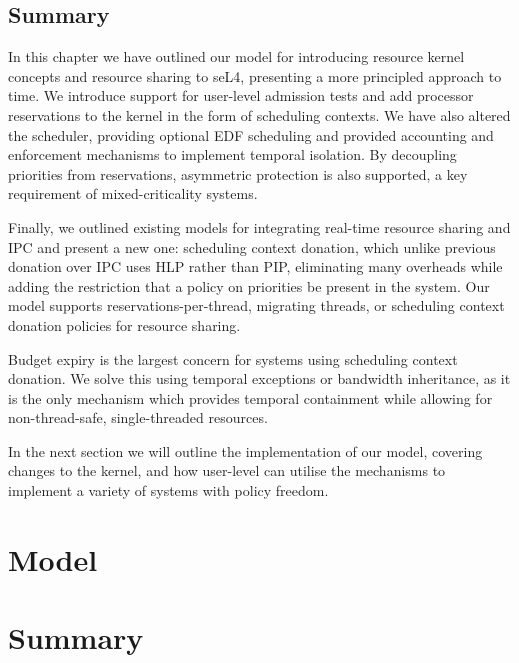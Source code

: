 \subsection{Summary}

In this chapter we have outlined our model for introducing resource kernel concepts and resource sharing to seL4, presenting a more principled approach to time.
We introduce support for user-level admission tests and add processor reservations to the kernel in the form of scheduling contexts.
We have also altered the scheduler, providing optional \gls{EDF} scheduling and provided accounting and enforcement mechanisms to implement temporal isolation.
By decoupling priorities from reservations, asymmetric protection is also supported, a key requirement of mixed-criticality systems.

Finally, we outlined existing models for integrating real-time resource sharing and IPC and present a new one: scheduling context donation, which unlike previous donation over IPC uses \gls{HLP} rather than \gls{PIP}, eliminating many overheads while adding the restriction that a policy on priorities be present in the system.
Our model supports reservations-per-thread, migrating threads, or scheduling context donation policies for resource sharing.

Budget expiry is the largest concern for systems using scheduling context donation.
We solve this using temporal exceptions or bandwidth inheritance, as it is the only mechanism which provides temporal containment while allowing for non-thread-safe, single-threaded resources.

In the next section we will outline the implementation of our model, covering changes to the kernel, and how user-level can utilise the mechanisms to implement a variety of systems with policy freedom.

\section{Model}






\section{Summary}

